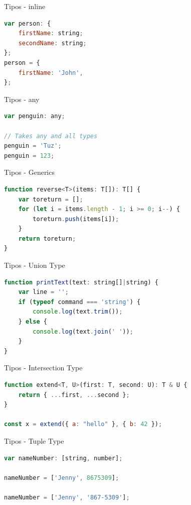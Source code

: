 \documentclass[aspectratio=169]{beamer}
\begin{document}
\begin{frame}[fragile]{Tipos - inline}
\begin{lstlisting}[language=JavaScript,basicstyle=\scriptsize]
var person: {
    firstName: string;
    secondName: string;
};
person = {
    firstName: 'John',
};
\end{lstlisting}
\end{frame}

\begin{frame}[fragile]{Tipos - any}
\begin{lstlisting}[language=JavaScript,basicstyle=\scriptsize]
var penguin: any;

// Takes any and all types
penguin = 'Tuz';
penguin = 123;

\end{lstlisting}
\end{frame}

\begin{frame}[fragile]{Tipos - Generics}
\begin{lstlisting}[language=JavaScript,basicstyle=\scriptsize]
function reverse<T>(items: T[]): T[] {
    var toreturn = [];
    for (let i = items.length - 1; i >= 0; i--) {
        toreturn.push(items[i]);
    }
    return toreturn;
}
\end{lstlisting}
\end{frame}

\begin{frame}[fragile]{Tipos - Union Type}
\begin{lstlisting}[language=JavaScript,basicstyle=\scriptsize]
function printText(text: string[]|string) {
    var line = '';
    if (typeof command === 'string') {
        console.log(text.trim());
    } else {
        console.log(text.join(' '));
    }
}
\end{lstlisting}
\end{frame}

\begin{frame}[fragile]{Tipos - Intersection Type}
\begin{lstlisting}[language=JavaScript,basicstyle=\scriptsize]
function extend<T, U>(first: T, second: U): T & U {
    return { ...first, ...second };
}

const x = extend({ a: "hello" }, { b: 42 });
\end{lstlisting}
\end{frame}

\begin{frame}[fragile]{Tipos - Tuple Type}
\begin{lstlisting}[language=JavaScript,basicstyle=\scriptsize]
var nameNumber: [string, number];

nameNumber = ['Jenny', 8675309];

nameNumber = ['Jenny', '867-5309'];
\end{lstlisting}
\end{frame}
\end{document}
